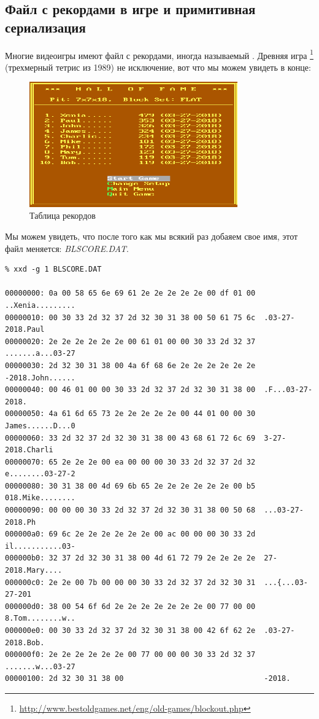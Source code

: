 \subsection{Файл с рекордами в игре  и примитивная сериализация}

Многие видеоигры имеют файл с рекордами, иногда называемый .
Древняя игра \footnote{\url{http://www.bestoldgames.net/eng/old-games/blockout.php}}
(трехмерный тетрис из 1989) не исключение, вот что мы можем увидеть в конце:

\begin{figure}[H]
\centering
\includegraphics[width=0.8\textwidth]{advanced/550_more_structs/blockout/hs.png}
\caption{Таблица рекордов}
\end{figure}

Мы можем увидеть, что после того как мы всякий раз добаяем свое имя, этот файл меняется: \emph{BLSCORE.DAT}.

\begin{lstlisting}
% xxd -g 1 BLSCORE.DAT

00000000: 0a 00 58 65 6e 69 61 2e 2e 2e 2e 2e 00 df 01 00  ..Xenia.........
00000010: 00 30 33 2d 32 37 2d 32 30 31 38 00 50 61 75 6c  .03-27-2018.Paul
00000020: 2e 2e 2e 2e 2e 2e 00 61 01 00 00 30 33 2d 32 37  .......a...03-27
00000030: 2d 32 30 31 38 00 4a 6f 68 6e 2e 2e 2e 2e 2e 2e  -2018.John......
00000040: 00 46 01 00 00 30 33 2d 32 37 2d 32 30 31 38 00  .F...03-27-2018.
00000050: 4a 61 6d 65 73 2e 2e 2e 2e 2e 00 44 01 00 00 30  James......D...0
00000060: 33 2d 32 37 2d 32 30 31 38 00 43 68 61 72 6c 69  3-27-2018.Charli
00000070: 65 2e 2e 2e 00 ea 00 00 00 30 33 2d 32 37 2d 32  e........03-27-2
00000080: 30 31 38 00 4d 69 6b 65 2e 2e 2e 2e 2e 2e 00 b5  018.Mike........
00000090: 00 00 00 30 33 2d 32 37 2d 32 30 31 38 00 50 68  ...03-27-2018.Ph
000000a0: 69 6c 2e 2e 2e 2e 2e 2e 00 ac 00 00 00 30 33 2d  il...........03-
000000b0: 32 37 2d 32 30 31 38 00 4d 61 72 79 2e 2e 2e 2e  27-2018.Mary....
000000c0: 2e 2e 00 7b 00 00 00 30 33 2d 32 37 2d 32 30 31  ...{...03-27-201
000000d0: 38 00 54 6f 6d 2e 2e 2e 2e 2e 2e 2e 00 77 00 00  8.Tom........w..
000000e0: 00 30 33 2d 32 37 2d 32 30 31 38 00 42 6f 62 2e  .03-27-2018.Bob.
000000f0: 2e 2e 2e 2e 2e 2e 00 77 00 00 00 30 33 2d 32 37  .......w...03-27
00000100: 2d 32 30 31 38 00                                -2018.
\end{lstlisting}

